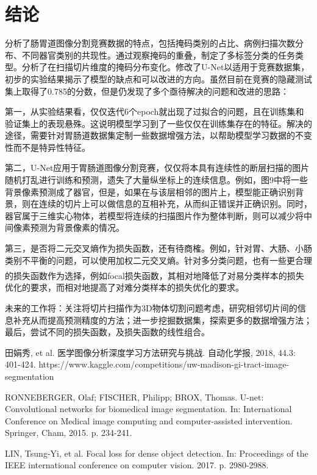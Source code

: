 \documentclass[letterpaper, 10pt, conference, twoside]{ieeeconf}
\newcommand{\upcite}[1]{\textsuperscript{\textsuperscript{\cite{#1}}}}
\begin{document}
\section{结论}

分析了肠胃道图像分割竞赛数据的特点，包括掩码类别的占比、病例扫描次数分布、不同器官类别的共现性。通过观察掩码的重叠，制定了多标签分类的任务类型。分析了在扫描切片维度的掩码分布变化。修改了U-Net以适用于竞赛数据集，初步的实验结果揭示了模型的缺点和可以改进的方向。虽然目前在竞赛的隐藏测试集上取得了0.785的分数，但是仍发现了多个亟待解决的问题和改进的思路：

第一，从实验结果看，仅仅迭代6个epoch就出现了过拟合的问题，且在训练集和验证集上的表现悬殊。这说明模型学习到了一些仅仅在训练集存在的特征。解决的途径，需要针对胃肠道数据集定制一些数据增强方法，以帮助模型学习数据的不变性而不是特异性特征。

第二，U-Net应用于胃肠道图像分割竞赛，仅仅将本具有连续性的断层扫描的图片随机打乱进行训练和预测，遗失了大量纵坐标上的连续信息。例如，图9中将一些背景像素预测成了器官，但是，如果在与该层相邻的图片上，模型能正确识别背景，则在连续的切片上可以做信息的互相补充，从而纠正错误并正确识别。同时，器官属于三维实心物体，若模型将连续的扫描图片作为整体判断，则可以减少将中间像素预测为背景像素的情况。

第三，是否将二元交叉熵作为损失函数，还有待商榷。例如，针对胃、大肠、小肠类别不平衡的问题，可以使用加权二元交叉熵。针对多分类问题，也有一些更合理的损失函数作为选择，例如focal损失函数\upcite{c4}，其相对地降低了对易分类样本的损失优化的要求，而相对地提高了对难分类样本的损失优化的要求。

未来的工作将：关注将切片扫描作为3D物体切割问题考虑，研究相邻切片间的信息补充从而提高预测精度的方法；进一步挖掘数据集，探索更多的数据增强方法；最后，尝试不同的损失函数，及损失函数的线性组合。




\begin{thebibliography}{99}

田娟秀, et al. 医学图像分析深度学习方法研究与挑战. 自动化学报, 2018, 44.3: 401-424.
https://www.kaggle.com/competitions/uw-madison-gi-tract-image-segmentation

RONNEBERGER, Olaf; FISCHER, Philipp; BROX, Thomas. U-net: Convolutional networks for biomedical image segmentation. In: International Conference on Medical image computing and computer-assisted intervention. Springer, Cham, 2015. p. 234-241.

LIN, Tsung-Yi, et al. Focal loss for dense object detection. In: Proceedings of the IEEE international conference on computer vision. 2017. p. 2980-2988.



\end{thebibliography}
\end{document}
